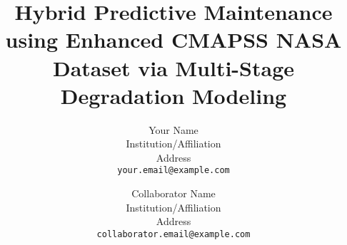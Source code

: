 \documentclass[10pt,twocolumn,letterpaper]{article}
\title{Hybrid Predictive Maintenance using Enhanced CMAPSS NASA Dataset via Multi-Stage Degradation Modeling} %
\author{Your Name\\ %
Institution/Affiliation\\
Address\\
{\tt\small your.email@example.com}
\and
Collaborator Name\\
Institution/Affiliation\\
Address\\
{\tt\small collaborator.email@example.com}
}
\begin{document}
\maketitle
















{
    \small
}

\end{document}
